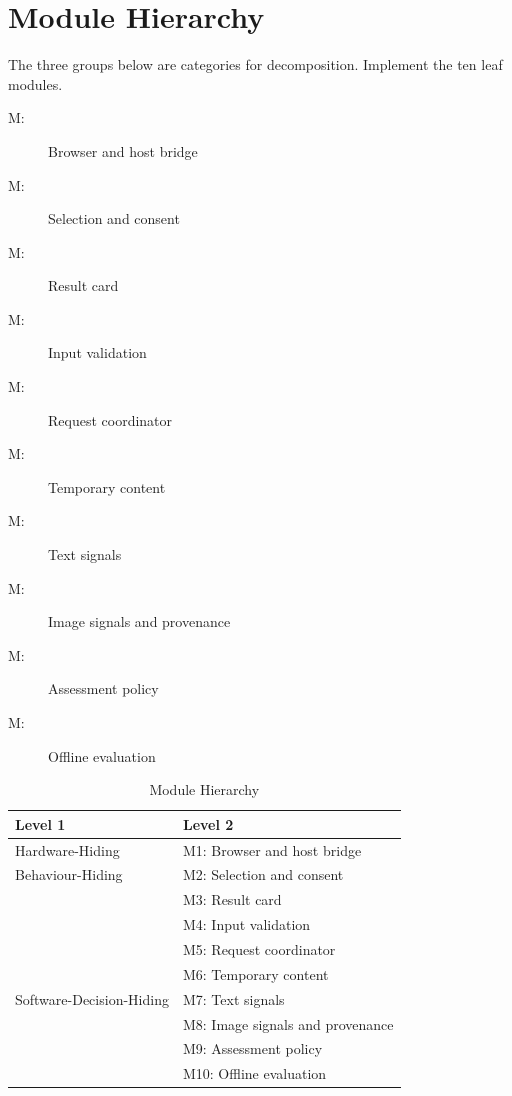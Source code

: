 \documentclass[12pt, titlepage]{article}
\newcounter{mnum}
\newcommand{\mthemnum}{M\themnum}
\begin{document}
\section{Module Hierarchy} \label{SecMH}

The three groups below are categories for decomposition. Implement the ten leaf modules.

\begin{description}
\item [ \mthemnum \label{mod:1}:] Browser and host bridge
\item [ \mthemnum \label{mod:2}:] Selection and consent
\item [ \mthemnum \label{mod:3}:] Result card
\item [ \mthemnum \label{mod:4}:] Input validation
\item [ \mthemnum \label{mod:5}:] Request coordinator
\item [ \mthemnum \label{mod:6}:] Temporary content
\item [ \mthemnum \label{mod:7}:] Text signals
\item [ \mthemnum \label{mod:8}:] Image signals and provenance
\item [ \mthemnum \label{mod:9}:] Assessment policy
\item [ \mthemnum \label{mod:10}:] Offline evaluation
\end{description}

\begin{table}[h!]
\centering
\begin{tabular}{p{} p{}}
\toprule
\textbf{Level 1} & \textbf{Level 2}\\
\midrule

Hardware-Hiding & M1: Browser and host bridge \\
\midrule

Behaviour-Hiding & M2: Selection and consent\\
& M3: Result card\\
& M4: Input validation\\
& M5: Request coordinator\\
& M6: Temporary content\\
\midrule

Software-Decision-Hiding & M7: Text signals\\
& M8: Image signals and provenance\\
& M9: Assessment policy\\
& M10: Offline evaluation\\
\bottomrule

\end{tabular}
\caption{Module Hierarchy}
\label{TblMH}
\end{table}
\end{document}
